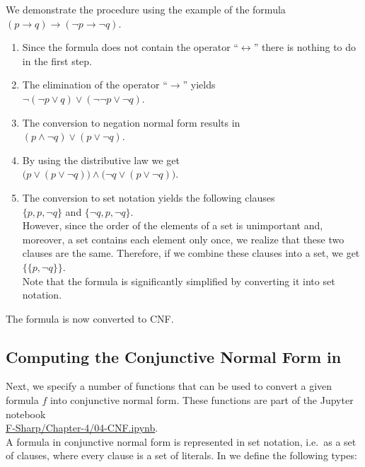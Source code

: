 We demonstrate the procedure using the example of the formula\\[0.2cm]
\hspace*{1.3cm} $(p \rightarrow q) \rightarrow (\neg p \rightarrow \neg q)$.
\begin{enumerate}
\item Since the formula does not contain the operator ``$\leftrightarrow$''
      there is nothing to do in the first step.
\item The elimination of the operator ``$\rightarrow$'' yields \\[0.2cm]
      \hspace*{1.3cm} $\neg (\neg p \vee q) \vee (\neg \neg p \vee \neg q)$.
\item The conversion to negation normal form results in \\[0.2cm]
      \hspace*{1.3cm} $(p \wedge \neg q) \vee (p \vee \neg q)$.
\item By using the distributive law we get \\[0.2cm]
      \hspace*{1.3cm} $\bigl(p \vee (p \vee \neg q)\bigr) \wedge \bigl(\neg q \vee (p \vee \neg q)\bigr)$.
\item The conversion to set notation yields the following clauses \\[0.2cm] 
      \hspace*{1.3cm} $\{p, p, \neg q\}$ \quad and \quad $\{\neg q, p, \neg q\}$. \\[0.2cm]
      However, since the order of the elements of a set is unimportant and, moreover, a set
      contains each element only once, we realize that these two clauses are the same.
      Therefore, if we combine these clauses into a set, we get \\[0.2cm]
      \hspace*{1.3cm} $\bigl\{ \{p, \neg q\} \bigr\}$. \\[0.2cm]
      Note that the formula is significantly simplified by converting it into set
      notation.
\end{enumerate}
The formula is now converted to CNF.

\subsection{Computing the Conjunctive Normal Form in \texorpdfstring{\Fsharp}{F\#}}
Next, we specify a number of functions that can be used to convert a given 
formula $f$ into conjunctive normal form.  These functions are part of the Jupyter notebook
\\[0.2cm]
\hspace*{1.3cm}
\href{https://github.com/karlstroetmann/Logic/blob/master/F-Sharp/Chapter-4/04-CNF.ipynb}{F-Sharp/Chapter-4/04-CNF.ipynb}.
\\[0.2cm]
A formula in conjunctive normal form is represented in set notation, i.e.~as a set of clauses, where every
clause is a set of literals.  In \Fsharp{} we define the following types:


